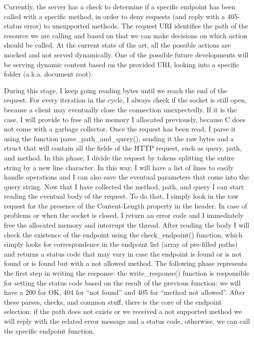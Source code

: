 \documentclass{article}
\begin{document}
Currently, the server has a check to determine if a specific endpoint has been called with a specific method, in order to deny requests (and reply with a 405-status error) to unsupported methods.
The request URI identifies the path of the resource we are calling and based on that we can make decisions on which action should be called. At the current state of the art, all the possible actions are mocked and not served dynamically. One of the possible future developments will be serving dynamic content based on the provided URI, looking into a specific folder (a.k.a. document root).

During this stage, I keep going reading bytes until we reach the end of the request.
For every iteration in the cycle, I always check if the socket is still open, because a client may eventually close the connection unexpectedly. If it is the case, I will provide to free all the memory I allocated previously, because C does not come with a garbage collector.
Once the request has been read, I parse it using the function parse\_path\_and\_query(), sending it the raw bytes and a struct that will contain all the fields of the HTTP request, such as query, path, and method. In this phase, I divide the request by tokens splitting the entire string by a new line character. In this way, I will have a list of lines to easily handle operations and I can also save the eventual parameters that come into the query string.
Now that I have collected the method, path, and query I can start reading the eventual body of the request. To do that, I simply look in the raw request for the presence of the Content-Length property in the header. In case of problems or when the socket is closed, I return an error code and I immediately free the allocated memory and interrupt the thread.
After reading the body I will check the existence of the endpoint using the check\_endpoint() function, which simply looks for correspondence in the endpoint list (array of pre-filled paths) and returns a status code that may vary in case the endpoint is found or is not found or is found but with a not allowed method.
The following phase represents the first step in writing the response: the write\_response() function is responsible for setting the status code based on the result of the previous function: we will have a 200 for OK, 404 for “not found” and 405 for “method not allowed”.
After these parses, checks, and common stuff, there is the core of the endpoint selection: if the path does not exists or we received a not supported method we will reply with the related error message and a status code, otherwise, we can call the specific endpoint function.
\end{document}
